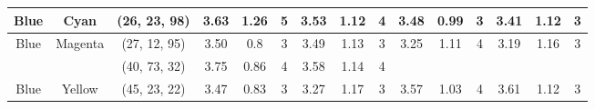 \begin{table}[htbp]
{\begin{tabular}{@{}ccclcccccccccccc@{}}
    Blue                    & \multicolumn{1}{c|}{Cyan}                      & \multicolumn{2}{c|}{\cellcolor[HTML]{0080FF}(26, 23, 98)}  & \multicolumn{1}{c|}{3.63} & \multicolumn{1}{c|}{1.26}  & \multicolumn{1}{c|}{\cellcolor[HTML]{32CB00}\textbf{5}} & \multicolumn{1}{c|}{3.53} & \multicolumn{1}{c|}{1.12}  & \multicolumn{1}{c||}{4}                                  & \multicolumn{1}{c|}{3.48}                   & \multicolumn{1}{c|}{0.99}                   & \multicolumn{1}{c|}{3}                                  & \multicolumn{1}{c|}{3.41}                   & \multicolumn{1}{c|}{1.12}                   & \multicolumn{1}{c|}{3}                                                    \\ \midrule
    Blue                    & \multicolumn{1}{c|}{Magenta}                   & \multicolumn{2}{c|}{\cellcolor[HTML]{8000FF}(27, 12, 95)}  & \multicolumn{1}{c|}{3.50} & \multicolumn{1}{c|}{0.8}   & \multicolumn{1}{c|}{3}                                  & \multicolumn{1}{c|}{3.49} & \multicolumn{1}{c|}{1.13}  & \multicolumn{1}{c||}{3}                                  & \multicolumn{1}{c|}{3.25}                   & \multicolumn{1}{c|}{1.11}                   & \multicolumn{1}{c|}{4}                                  & \multicolumn{1}{c|}{3.19}                   & \multicolumn{1}{c|}{1.16}                   & \multicolumn{1}{c|}{3}                                                    \\ \midrule
                            & \multicolumn{1}{c|}{}                          & \multicolumn{2}{c|}{\cellcolor[HTML]{00FF80}(40, 73, 32)}  & \multicolumn{1}{c|}{3.75} & \multicolumn{1}{c|}{0.86}  & \multicolumn{1}{c|}{4}                                  & \multicolumn{1}{c|}{3.58} & \multicolumn{1}{c|}{1.14}  & \multicolumn{1}{c||}{4}                                  & \multicolumn{1}{c|}{}                       & \multicolumn{1}{c|}{}                       & \multicolumn{1}{c|}{}                                   & \multicolumn{1}{c|}{}                       & \multicolumn{1}{c|}{}                       & \multicolumn{1}{c|}{}                                                     \\ \cmidrule(lr){3-10}
    \multirow{-2}{*}{Blue}  & \multicolumn{1}{c|}{\multirow{-2}{*}{Yellow}}  & \multicolumn{2}{c|}{\cellcolor[HTML]{FF007F}(45, 23, 22)}  & \multicolumn{1}{c|}{3.47} & \multicolumn{1}{c|}{0.83}  & \multicolumn{1}{c|}{3}                                  & \multicolumn{1}{c|}{3.27} & \multicolumn{1}{c|}{1.17}  & \multicolumn{1}{c||}{3}                                  & \multicolumn{1}{c|}{\multirow{-2}{*}{3.57}} & \multicolumn{1}{c|}{\multirow{-2}{*}{1.03}} & \multicolumn{1}{c|}{\multirow{-2}{*}{4}}                & \multicolumn{1}{c|}{\multirow{-2}{*}{3.61}} & \multicolumn{1}{c|}{\multirow{-2}{*}{1.12}} & \multicolumn{1}{c|}{\multirow{-2}{*}{3}}                                  \\ \midrule

\end{tabular}}
\end{table}
